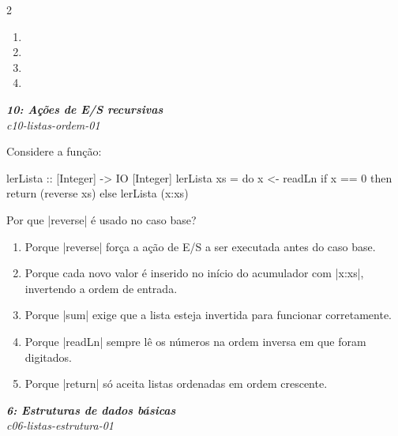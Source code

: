 \documentclass[a4paper,10pt,brazil]{article}
\begin{document}
\begin{multicols}{2}
\begin{enumerate}
  \item \haskellinline{[42, "ok"]}

  \item {}

  \item {}

  \item {}


\end{enumerate}

\begin{flushright}
  \footnotesize
  \textit{\textbf{10: Ações de E/S recursivas}}\\
  \textit{c10-listas-ordem-01}\\

\end{flushright}
Considere a função:

\begin{haskellcode}
lerLista :: [Integer] -> IO [Integer]
lerLista xs = do
  x <- readLn
  if x == 0
    then return (reverse xs)
    else lerLista (x:xs)
\end{haskellcode}

Por que \haskellinline|reverse| é usado no caso base?

\begin{enumerate}
  \item Porque \haskellinline|reverse| força a ação de E/S a ser executada antes do caso base.

  \item Porque cada novo valor é inserido no início do acumulador com \haskellinline|x:xs|, invertendo a ordem de entrada.

  \item Porque \haskellinline|sum| exige que a lista esteja invertida para funcionar corretamente.

  \item Porque \haskellinline|readLn| sempre lê os números na ordem inversa em que foram digitados.

  \item Porque \haskellinline|return| só aceita listas ordenadas em ordem crescente.


\end{enumerate}

\begin{flushright}
  \footnotesize
  \textit{\textbf{6: Estruturas de dados básicas}}\\
  \textit{c06-listas-estrutura-01}\\


\end{flushright}
\end{multicols}
\end{document}
